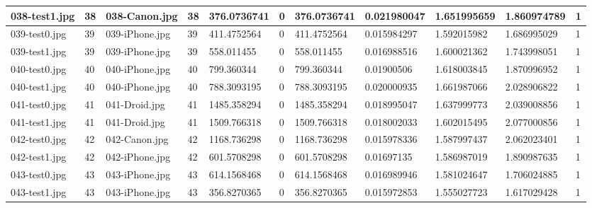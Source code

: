 \begin{landscape}
\begin{longtable}{|p{2cm}|p{1cm}|p{2cm}|p{1cm}|p{2cm}|p{1cm}|p{2cm}|p{2cm}|p{2cm}|p{2cm}|p{1cm}|}
	\hline
	038-test1.jpg & 38       & 038-Canon.jpg  & 38                   & 376.0736741   & 0                & 376.0736741         & 0.021980047   & 1.651995659   & 1.860974789       & 1         \\ 
	\hline
	039-test0.jpg & 39       & 039-iPhone.jpg & 39                   & 411.4752564   & 0                & 411.4752564         & 0.015984297   & 1.592015982   & 1.686995029       & 1         \\ 
	\hline
	039-test1.jpg & 39       & 039-iPhone.jpg & 39                   & 558.011455    & 0                & 558.011455          & 0.016988516   & 1.600021362   & 1.743998051       & 1         \\ 
	\hline
	040-test0.jpg & 40       & 040-iPhone.jpg & 40                   & 799.360344    & 0                & 799.360344          & 0.01900506    & 1.618003845   & 1.870996952       & 1         \\ 
	\hline
	040-test1.jpg & 40       & 040-iPhone.jpg & 40                   & 788.3093195   & 0                & 788.3093195         & 0.020000935   & 1.661987066   & 2.028906822       & 1         \\ 
	\hline
	041-test0.jpg & 41       & 041-Droid.jpg  & 41                   & 1485.358294   & 0                & 1485.358294         & 0.018995047   & 1.637999773   & 2.039008856       & 1         \\ 
	\hline
	041-test1.jpg & 41       & 041-Droid.jpg  & 41                   & 1509.766318   & 0                & 1509.766318         & 0.018002033   & 1.602015495   & 2.077000856       & 1         \\ 
	\hline
	042-test0.jpg & 42       & 042-Canon.jpg  & 42                   & 1168.736298   & 0                & 1168.736298         & 0.015978336   & 1.587997437   & 2.062023401       & 1         \\ 
	\hline
	042-test1.jpg & 42       & 042-iPhone.jpg & 42                   & 601.5708298   & 0                & 601.5708298         & 0.01697135    & 1.586987019   & 1.890987635       & 1         \\ 
	\hline
	043-test0.jpg & 43       & 043-iPhone.jpg & 43                   & 614.1568468   & 0                & 614.1568468         & 0.016989946   & 1.581024647   & 1.706024885       & 1         \\ 
	\hline
	043-test1.jpg & 43       & 043-iPhone.jpg & 43                   & 356.8270365   & 0                & 356.8270365         & 0.015972853   & 1.555027723   & 1.617029428       & 1         \\ 

\end{longtable}
\end{landscape}
